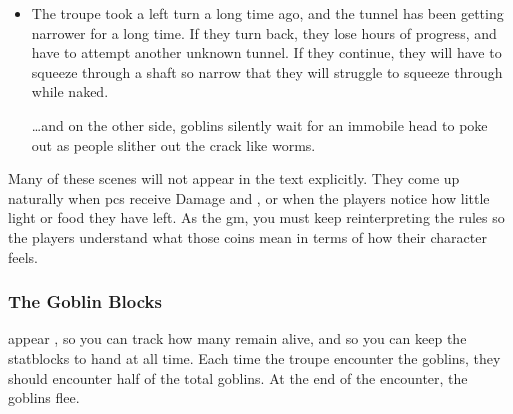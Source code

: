 \begin{multicols}{2}
\begin{itemize}
	\begin{speechtext}
		``We should follow the tracks, so we avoid dead-ends.''
	\end{speechtext}
	There is a lot to discuss, but limited time.%
	\footnote{If you want to guarantee that this chapter takes precisely one evening, you might want to set a timer.
	If you have a tall candle, you can drive three nails into it, to indicate four  passing.
	Of course, if the troupe split into two, you may need to add an extra candle to the evening.}
	\item
	The troupe took a left turn a long time ago, and the tunnel has been getting narrower for a long time.
	If they turn back, they lose hours of progress, and have to attempt another unknown tunnel.
	If they continue, they will have to squeeze through a shaft so narrow that they will struggle to squeeze through while naked.

	\ldots and on the other side, goblins silently wait for an immobile head to poke out as people slither out the crack like worms.
\end{itemize}

Many of these scenes will not appear in the text explicitly.
They come up naturally when \glspl{pc} receive Damage and , or when the players notice how little light or food they have left.
As the \gls{gm}, you must keep reinterpreting the rules so the players understand what those  coins mean in terms of how their character feels.

\subsubsection{The Goblin Blocks}
appear , so you can track how many remain alive, and so you can keep the \glspl{statblock} to hand at all time.
Each time the troupe encounter the goblins, they should encounter half of the total goblins.
At the end of the encounter, the goblins flee.

\end{multicols}
